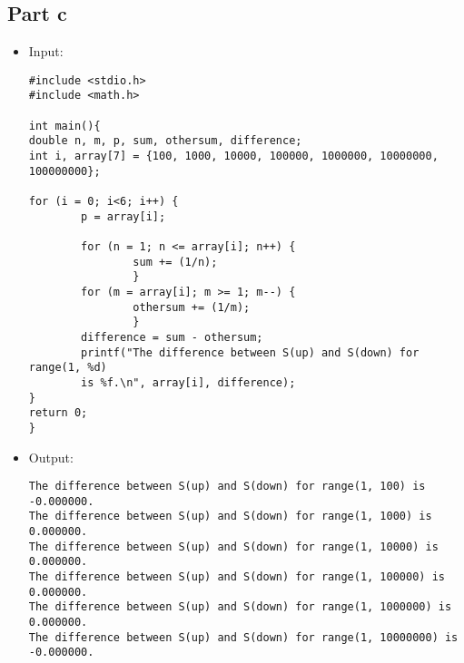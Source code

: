 \documentclass[10pt]{article}
\begin{document}
\subsection{Part c}
\begin{itemize}
\item Input:
\begin{verbatim}
#include <stdio.h>
#include <math.h>

int main(){
double n, m, p, sum, othersum, difference;
int i, array[7] = {100, 1000, 10000, 100000, 1000000, 10000000, 100000000};

for (i = 0; i<6; i++) {
        p = array[i];

        for (n = 1; n <= array[i]; n++) {
                sum += (1/n);
                }
        for (m = array[i]; m >= 1; m--) {
                othersum += (1/m);
                }
        difference = sum - othersum;
        printf("The difference between S(up) and S(down) for range(1, %d) 
        is %f.\n", array[i], difference);
}
return 0;
}
\end{verbatim}
\item Output:
\begin{verbatim}
The difference between S(up) and S(down) for range(1, 100) is -0.000000.
The difference between S(up) and S(down) for range(1, 1000) is 0.000000.
The difference between S(up) and S(down) for range(1, 10000) is 0.000000.
The difference between S(up) and S(down) for range(1, 100000) is 0.000000.
The difference between S(up) and S(down) for range(1, 1000000) is 0.000000.
The difference between S(up) and S(down) for range(1, 10000000) is -0.000000.
\end{verbatim}
\end{itemize}
\end{document}
